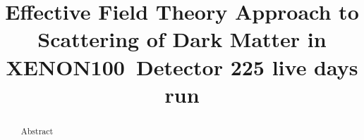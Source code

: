 \documentclass[twocolumn, showpacs, showkeys, amsmath, amssymb, amsfonts, floatfix, linenumbers]{revtex4-1}
\newcommand{\Xehund}{{XENON100}}
\begin{document}

\title{Effective Field Theory Approach to Scattering of Dark Matter in  \Xehund\ Detector 225 live days run}
%


\begin{abstract} 

Abstract
\end{abstract}

\pacs{}

\maketitle 












%


\end{document}
